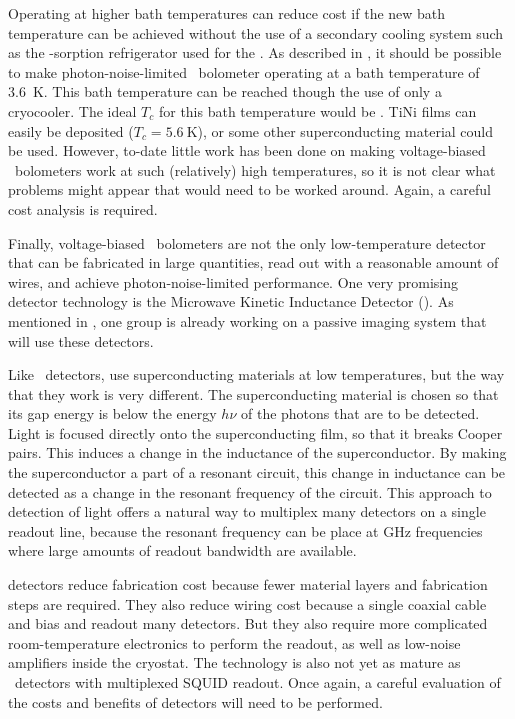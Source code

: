 Operating at higher bath temperatures can reduce cost if the new bath temperature can be achieved without the use of a secondary cooling system such as the -sorption refrigerator used for the \Imager.
As described in , it should be possible to make photon-noise-limited \TES\ bolometer operating at a bath temperature of \SI{3.6}{\K}.
This bath temperature can be reached though the use of only a cryocooler.
The ideal $T_c$ for this bath temperature would be .
TiNi films can easily be deposited ($T_c = \SI{5.6}{\K}$), or some other superconducting material could be used.
However, to-date little work has been done on making voltage-biased \TES\ bolometers work at such (relatively) high temperatures, so it is not clear what problems might appear that would need to be worked around.
Again, a careful cost analysis is required.

Finally, voltage-biased \TES\ bolometers are not the only low-temperature detector that can be fabricated in large quantities, read out with a reasonable amount of wires, and achieve photon-noise-limited performance.
One very promising detector technology is the Microwave Kinetic Inductance Detector (\MKID).
As mentioned in , one group is already working on a passive imaging system that will use these detectors.

Like \TES\ detectors, \MKIDs use superconducting materials at low temperatures, but the way that they work is very different.
The superconducting material is chosen so that its gap energy is below the energy $h \nu$ of the photons that are to be detected.
Light is focused directly onto the superconducting film, so that it breaks Cooper pairs.
This induces a change in the inductance of the superconductor.
By making the superconductor a part of a resonant circuit, this change in inductance can be detected as a change in the resonant frequency of the circuit.
This approach to detection of light offers a natural way to multiplex many detectors on a single readout line, because the resonant frequency can be place at GHz frequencies where large amounts of readout bandwidth are available.

\MKID detectors reduce fabrication cost because fewer material layers and fabrication steps are required.
They also reduce wiring cost because a single coaxial cable and bias and readout many detectors.
But they also require more complicated room-temperature electronics to perform the readout, as well as low-noise amplifiers inside the cryostat.
The technology is also not yet as mature as \TES\ detectors with multiplexed SQUID readout.
Once again, a careful evaluation of the costs and benefits of \MKID detectors will need to be performed.

